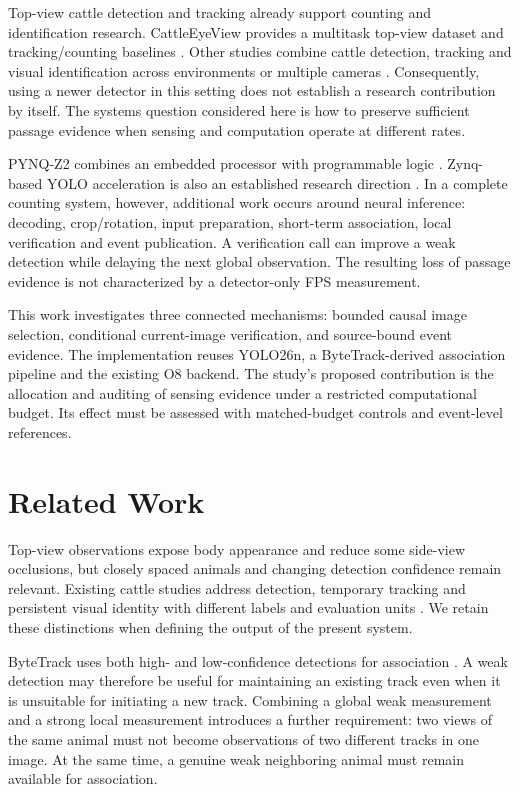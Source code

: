 \documentclass[journal]{IEEEtran}
\begin{document}
Top-view cattle detection and tracking already support counting and identification research. CattleEyeView provides a multitask top-view dataset and tracking/counting baselines \cite{cattleeyeview}. Other studies combine cattle detection, tracking and visual identification across environments or multiple cameras \cite{cattle_id_2024,black_cattle_2025}. Consequently, using a newer detector in this setting does not establish a research contribution by itself. The systems question considered here is how to preserve sufficient passage evidence when sensing and computation operate at different rates.

PYNQ-Z2 combines an embedded processor with programmable logic \cite{pynqz2}. Zynq-based YOLO acceleration is also an established research direction \cite{zynq_yolo_2024}. In a complete counting system, however, additional work occurs around neural inference: decoding, crop/rotation, input preparation, short-term association, local verification and event publication. A verification call can improve a weak detection while delaying the next global observation. The resulting loss of passage evidence is not characterized by a detector-only FPS measurement.

This work investigates three connected mechanisms: bounded causal image selection, conditional current-image verification, and source-bound event evidence. The implementation reuses YOLO26n, a ByteTrack-derived association pipeline and the existing O8 backend. The study's proposed contribution is the allocation and auditing of sensing evidence under a restricted computational budget. Its effect must be assessed with matched-budget controls and event-level references.

\section{Related Work}
Top-view observations expose body appearance and reduce some side-view occlusions, but closely spaced animals and changing detection confidence remain relevant. Existing cattle studies address detection, temporary tracking and persistent visual identity with different labels and evaluation units \cite{cattleeyeview,cattle_id_2024,black_cattle_2025}. We retain these distinctions when defining the output of the present system.

ByteTrack uses both high- and low-confidence detections for association \cite{bytetrack}. A weak detection may therefore be useful for maintaining an existing track even when it is unsuitable for initiating a new track. Combining a global weak measurement and a strong local measurement introduces a further requirement: two views of the same animal must not become observations of two different tracks in one image. At the same time, a genuine weak neighboring animal must remain available for association.
\end{document}
